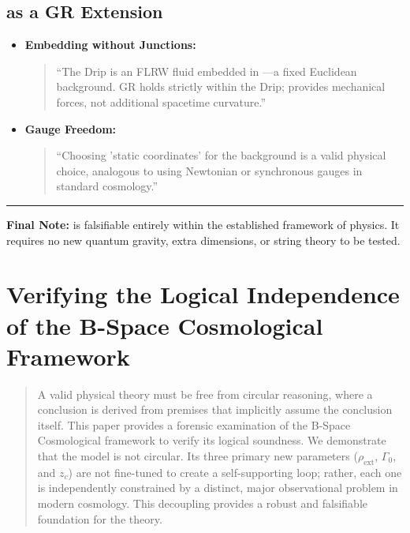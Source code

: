 \documentclass{BSpacePaper} %
\begin{document}
\begin{appendices}
\subsection{\bspace{} as a GR Extension}
\begin{itemize}
    \item \textbf{Embedding without Junctions:}
    \begin{quote}
        ``The Drip is an FLRW fluid embedded in \bspace{}—a fixed Euclidean background. GR holds strictly within the Drip; \bspace{} provides mechanical forces, not additional spacetime curvature.''
    \end{quote}
    \item \textbf{Gauge Freedom:}
    \begin{quote}
        ``Choosing 'static coordinates' for the background is a valid physical choice, analogous to using Newtonian or synchronous gauges in standard cosmology.''
    \end{quote}
\end{itemize}

\hrule
\vspace{1em}
\noindent \textbf{Final Note:} \bspace{} is falsifiable entirely within the established framework of physics. It requires no new quantum gravity, extra dimensions, or string theory to be tested.

\clearpage

\section{Verifying the Logical Independence of the B-Space Cosmological Framework}
\label{app:circularity}
\setcounter{equation}{0}
\setcounter{table}{0}

\begin{abstract}
\noindent
A valid physical theory must be free from circular reasoning, where a conclusion is derived from premises that implicitly assume the conclusion itself. This paper provides a forensic examination of the B-Space Cosmological framework to verify its logical soundness. We demonstrate that the model is not circular. Its three primary new parameters ($\rho_{\text{ext}}$, $\Gamma_0$, and $z_c$) are not fine-tuned to create a self-supporting loop; rather, each one is independently constrained by a distinct, major observational problem in modern cosmology. This decoupling provides a robust and falsifiable foundation for the theory.
\end{abstract}


\end{appendices}
\end{document}
